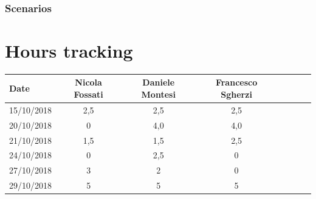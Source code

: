 \documentclass[a4paper,oneside,11pt]{article}
\begin{document}
        \subsubsection{Scenarios}
            
    
        \section{Hours tracking}
        \begin{tabular}{l*{6}{c}r}
            Date & Nicola Fossati & Daniele Montesi & Francesco Sgherzi \\
            \hline
            15/10/2018 & 2,5 & 2,5 & 2,5   \\
            \hline
            20/10/2018 & 0 & 4,0 & 4,0 \\
            \hline
            21/10/2018 & 1,5 & 1,5 & 2,5 \\
            \hline
            24/10/2018 & 0 & 2,5 & 0 \\
             \hline
            27/10/2018 & 3 & 2 & 0 \\
             \hline
            29/10/2018 & 5 & 5 & 5 \\
        \end{tabular}
\end{document}
